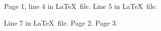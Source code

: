 \documentclass{article}
\begin{document}
    Page 1, line 4 in \LaTeX\ file.
    Line 5 in \LaTeX\ file.

    Line 7 in \LaTeX\ file.
    \newpage
    Page 2.
    \newpage
    Page 3.
\end{document}
